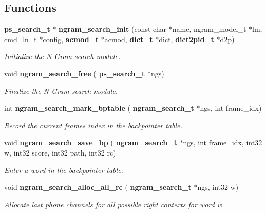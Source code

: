 \subsection*{Functions}
\begin{DoxyCompactItemize}
\item 
\mbox{\label{ngram__search_8h_a04f80b377c847026254fb85596e2f43c}} 
\textbf{ ps\+\_\+search\+\_\+t} $\ast$ \textbf{ ngram\+\_\+search\+\_\+init} (const char $\ast$name, ngram\+\_\+model\+\_\+t $\ast$lm, cmd\+\_\+ln\+\_\+t $\ast$config, \textbf{ acmod\+\_\+t} $\ast$acmod, \textbf{ dict\+\_\+t} $\ast$dict, \textbf{ dict2pid\+\_\+t} $\ast$d2p)
\begin{DoxyCompactList}\small\item\em Initialize the N-\/\+Gram search module. \end{DoxyCompactList}\item 
\mbox{\label{ngram__search_8h_a9bafaa4af5a9a4f9e76a8daf54ac4a11}} 
void \textbf{ ngram\+\_\+search\+\_\+free} (\textbf{ ps\+\_\+search\+\_\+t} $\ast$ngs)
\begin{DoxyCompactList}\small\item\em Finalize the N-\/\+Gram search module. \end{DoxyCompactList}\item 
int \textbf{ ngram\+\_\+search\+\_\+mark\+\_\+bptable} (\textbf{ ngram\+\_\+search\+\_\+t} $\ast$ngs, int frame\+\_\+idx)
\begin{DoxyCompactList}\small\item\em Record the current frame\textquotesingle{}s index in the backpointer table. \end{DoxyCompactList}\item 
\mbox{\label{ngram__search_8h_ae36649be6f5a2190e759e7ed13bd7b6b}} 
void \textbf{ ngram\+\_\+search\+\_\+save\+\_\+bp} (\textbf{ ngram\+\_\+search\+\_\+t} $\ast$ngs, int frame\+\_\+idx, int32 w, int32 score, int32 path, int32 rc)
\begin{DoxyCompactList}\small\item\em Enter a word in the backpointer table. \end{DoxyCompactList}\item 
\mbox{\label{ngram__search_8h_a1ddcc1a9cb3e164ceb2140097ed23a3e}} 
void \textbf{ ngram\+\_\+search\+\_\+alloc\+\_\+all\+\_\+rc} (\textbf{ ngram\+\_\+search\+\_\+t} $\ast$ngs, int32 w)
\begin{DoxyCompactList}\small\item\em Allocate last phone channels for all possible right contexts for word w. \end{DoxyCompactList}\item 

\end{DoxyCompactItemize}
